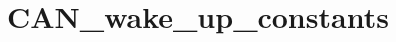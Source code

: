 \hypertarget{group___c_a_n__wake__up__constants}{\section{C\-A\-N\-\_\-wake\-\_\-up\-\_\-constants}
\label{group___c_a_n__wake__up__constants}
}
